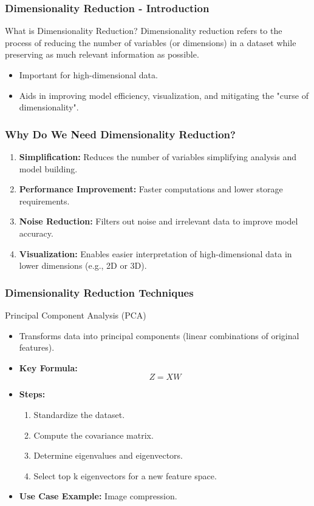 \documentclass[aspectratio=169]{beamer}
\begin{document}
\begin{frame}[fragile]
    \frametitle{Dimensionality Reduction - Introduction}
    \begin{block}{What is Dimensionality Reduction?}
        Dimensionality reduction refers to the process of reducing the number of variables (or dimensions) in a dataset while preserving as much relevant information as possible. 
    \end{block}
    
    \begin{itemize}
        \item Important for high-dimensional data.
        \item Aids in improving model efficiency, visualization, and mitigating the "curse of dimensionality".
    \end{itemize}
\end{frame}

\begin{frame}[fragile]
    \frametitle{Why Do We Need Dimensionality Reduction?}
    \begin{enumerate}
        \item \textbf{Simplification:} Reduces the number of variables simplifying analysis and model building.
        \item \textbf{Performance Improvement:} Faster computations and lower storage requirements.
        \item \textbf{Noise Reduction:} Filters out noise and irrelevant data to improve model accuracy.
        \item \textbf{Visualization:} Enables easier interpretation of high-dimensional data in lower dimensions (e.g., 2D or 3D).
    \end{enumerate}
\end{frame}

\begin{frame}[fragile]
    \frametitle{Dimensionality Reduction Techniques}
    \begin{block}{Principal Component Analysis (PCA)}
        \begin{itemize}
            \item Transforms data into principal components (linear combinations of original features).
            \item \textbf{Key Formula:}
            \[
            Z = XW
            \]
            \item \textbf{Steps:}
            \begin{enumerate}
                \item Standardize the dataset.
                \item Compute the covariance matrix.
                \item Determine eigenvalues and eigenvectors.
                \item Select top k eigenvectors for a new feature space.
            \end{enumerate}
            \item \textbf{Use Case Example:} Image compression.
        \end{itemize}
    \end{block}
\end{frame}
\end{document}
